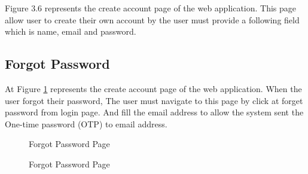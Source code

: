 \documentclass[12pt,oneside,openright,a4paper]{cpe-english-project}
\begin{document}
Figure 3.6 represents the create account page of the web application. This page allow user to create their own account by the user must provide a following field which is name, email and password.

\subsection{Forgot Password}

At Figure \ref{fig:Forgot-Password} represents the create account page of the web application. When the user forgot their password, The user must navigate to this page by click at forget password from login page. And fill the email address to allow the system sent the One-time password (OTP) to email address. 


\begin{figure}[!h]
\centering
{}
\caption{Forgot Password Page}\label{fig:Forgot-Password}
\end{figure}



\begin{figure}[!h]
\centering
{}
\caption{Forgot Password Page}\label{fig:Forgot-Password-code}
\end{figure}
\end{document}
